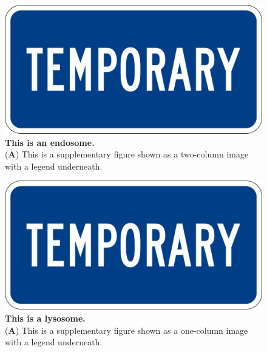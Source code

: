 \documentclass[vruler,JCS]{COB}
\begin{document}




\newcommand{\newblock}{}




\clearpage

\setcounter{figure}{0} %
\makeatletter 
\renewcommand{\thefigure}{S\@arabic\c@figure} %
\makeatother


\begin{figure}
\centering
\includegraphics[width=0.75\linewidth]{Figures/temp.png}
\caption{\textbf{This is an endosome.}\\
(\textbf{A}) This is a supplementary figure shown as a two-column image with a legend underneath.}
\label{suppfig:endosome}
\end{figure}

\begin{figure}
\centering
\includegraphics[width=0.75\linewidth]{Figures/temp.png}
\caption{\textbf{This is a lysosome.}\\
(\textbf{A}) This is a supplementary figure shown as a one-column image with a legend underneath.}
\label{suppfig:lysosome}
\end{figure}
\end{document}
